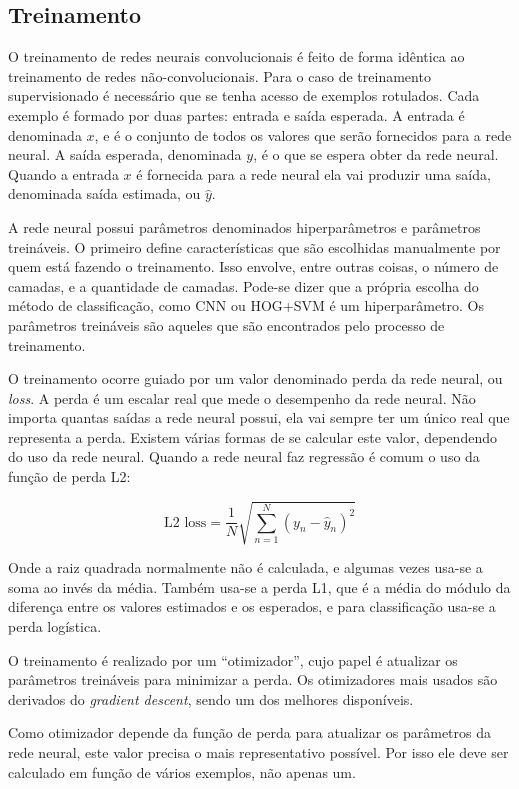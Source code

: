 \subsection{Treinamento}
O treinamento de redes neurais convolucionais é feito de forma idêntica ao
treinamento de redes não-convolucionais. Para o caso de treinamento
supervisionado é necessário que se tenha acesso de exemplos rotulados.
Cada exemplo é formado por duas partes: entrada e saída esperada.
A entrada é denominada $x$, e é o conjunto de todos os valores que serão
fornecidos para a rede neural.
A saída esperada, denominada $y$, é o que se espera obter da rede neural.
Quando a entrada $x$ é fornecida para a rede neural ela vai produzir uma saída,
denominada saída estimada, ou $\widehat{y}$.

A rede neural possui parâmetros denominados hiperparâmetros e parâmetros
treináveis. O primeiro define características que são escolhidas manualmente
por quem está fazendo o treinamento. Isso envolve, entre outras coisas, o
número de camadas, e a quantidade de camadas. Pode-se dizer que a própria
escolha do método de classificação, como CNN ou HOG+SVM é um hiperparâmetro. Os
parâmetros treináveis são aqueles que são encontrados pelo processo de
treinamento.

O treinamento ocorre guiado por um valor denominado perda da rede neural, ou
\emph{loss}. A perda é um escalar real que mede o desempenho da rede neural.
Não importa quantas saídas a rede neural possui, ela vai sempre ter um único
real que representa a perda. Existem várias formas de se calcular este valor,
dependendo do uso da rede neural. Quando a rede neural faz regressão é comum o
uso da função de perda L2:

\begin{equation}
	\text{L2 loss}=
		\frac{1}{N} \sqrt{ \sum_{n=1}^N \left( y_n - \widehat{y}_n \right)^2 }
\end{equation}

Onde a raiz quadrada normalmente não é calculada, e algumas vezes usa-se a soma
ao invés da média. Também usa-se a perda L1, que é a média do módulo da
diferença entre os valores estimados e os esperados, e para classificação
usa-se a perda logística.

O treinamento é realizado por um ``otimizador'', cujo papel é atualizar os
parâmetros treináveis para minimizar a perda. Os otimizadores mais usados são
derivados do \emph{gradient descent}, sendo  um dos
melhores disponíveis.

Como otimizador depende da função de perda para atualizar os parâmetros da rede
neural, este valor precisa o mais representativo possível. Por isso ele deve
ser calculado em função de vários exemplos, não apenas um.

